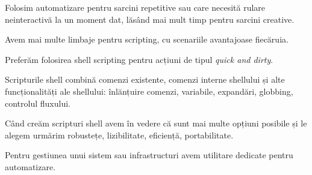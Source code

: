 Folosim automatizare pentru sarcini repetitive sau care necesită rulare neinteractivă la un moment dat, lăsând mai mult timp pentru sarcini creative.

Avem mai multe limbaje pentru scripting, cu scenariile avantajoase fiecăruia.

Preferăm folosirea shell scripting pentru acțiuni de tipul \textit{quick and dirty}.

Scripturile shell combină comenzi existente, comenzi interne shellului și alte funcționalități ale shellului: înlănțuire comenzi, variabile, expandări, globbing, controlul fluxului.

Când creăm scripturi shell avem în vedere că sunt mai multe opțiuni posibile și le alegem urmărim robustețe, lizibilitate, eficiență, portabilitate.

Pentru gestiunea unui sistem sau infrastructuri avem utilitare dedicate pentru automatizare.
